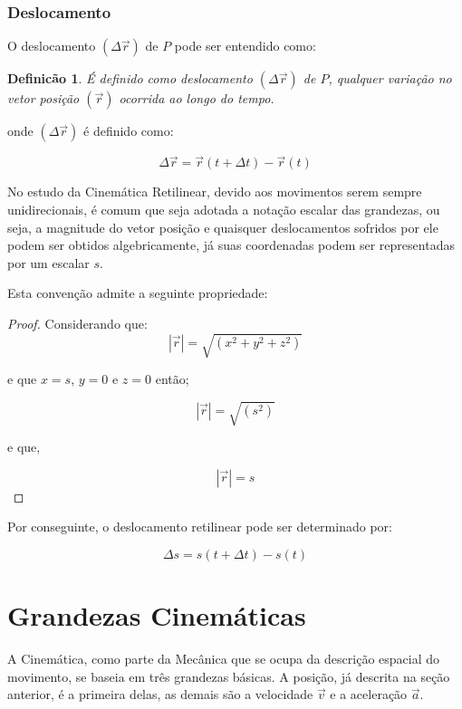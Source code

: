 \documentclass[a4paper, 11pt]{report}
\newtheorem{mydef}{Definicão}
\newtheorem{proof}{Demonstração}
\begin{document}
\subsubsection*{Deslocamento}
O deslocamento $(\Delta \vec{r})$ de $P$ pode ser entendido como:

\begin{mydef}
    É definido como deslocamento $(\Delta \vec{r})$ de $P$, qualquer variação 
    no vetor posição $(\vec{r})$ ocorrida ao longo do tempo.
\end{mydef}

onde $(\Delta \vec{r})$ é definido como:

\begin{equation}
    \Delta \vec{r} = \vec{r}(t + \Delta t ) - \vec{r}(t)
\end{equation}

No estudo da Cinemática Retilinear, devido aos movimentos serem sempre 
unidirecionais, é comum que seja adotada a notação escalar das grandezas, ou 
seja, a magnitude do vetor posição e quaisquer deslocamentos sofridos por 
ele podem ser obtidos algebricamente, já suas coordenadas podem ser 
representadas por um escalar $s$.

Esta convenção admite a seguinte propriedade:

\begin{proof}
Considerando que:
$$
\left |\vec{r} \right | = \sqrt{(x^2 + y^2 + z^2)}
$$

e que $x=s$, $y=0$ e $z=0$ então; 

$$
\left |\vec{r} \right | = \sqrt{(s^2)}
$$

e que, 

$$
\left |\vec{r} \right | = s
$$

\end{proof}
Por conseguinte, o deslocamento retilinear pode ser determinado por:

\begin{equation}
    \Delta s = s( t + \Delta t ) - s(t)
\end{equation}

\section{Grandezas Cinemáticas}

A Cinemática, como parte da Mecânica que se ocupa da descrição espacial do 
movimento, se baseia em três grandezas básicas. A posição, 
já descrita na seção anterior, é a primeira delas, as demais são a 
velocidade $\vec{v}$ e a aceleração $\vec{a}$.
\end{document}
